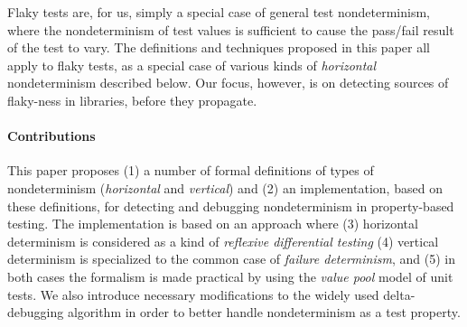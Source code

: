 Flaky tests are, for us, simply a special case of general test
nondeterminism, where the nondeterminism of test values is sufficient
to cause the pass/fail result of the test to vary.  The definitions
and techniques proposed in this paper all apply to flaky tests, as a
special case of various kinds of \emph{horizontal} nondeterminism
described below.  Our focus, however, is on detecting sources of
flaky-ness in libraries, before they propagate.

\paragraph{Contributions}


This paper proposes (1) a number of formal definitions of types of
nondeterminism (\emph{horizontal} and \emph{vertical}) and (2) an implementation, based on these definitions, for detecting and debugging
nondeterminism in property-based testing.  The implementation is based
on an approach where (3) horizontal determinism is considered as a
kind of \emph{reflexive differential testing} (4) vertical
determinism is specialized to the common case of \emph{failure
  determinism}, and (5)  in both cases the formalism is made practical
by using the \emph{value pool} model of unit tests.
We also introduce necessary modifications to the widely used delta-debugging algorithm in order to better handle
nondeterminism as a test property.

